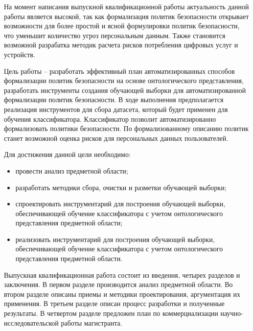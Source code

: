 \documentclass[../main]{subfiles}
\begin{document}
На момент написания выпускной квалификационной работы актуальность данной работы является высокой, так как формализация политик безопасности открывает возможности для более простой и ясной формулировки политик безопасности, что уменьшит количество угроз персональным данным. Также становится возможной разрабатка методик расчета рисков потребления цифровых услуг и устройств.

Цель работы -- разработать эффективный план автоматизированных способов формализации политик безопасности на основе онтологического представления, разработать инструменты создания обучающей выборки для автоматизированной формализации политик безопасности. В ходе выполнения предполагается реализация инструментов для сбора датасета, который будет применен для обучения классификатора. Классификатор позволит автоматизированно формализовать политики безопасности. По формализованному описанию политик станет возможной оценка рисков для персональных данных пользователей.

Для достижения данной цели необходимо:

\begin{itemize}
    \item провести анализ предметной области;
    \item разработать методики сбора, очистки и разметки обучающей выборки;
    \item спроектировать инструментарий для построения обучающей выборки, обеспечивающей обучение классификатора с учетом онтологического представления предметной области;
    \item реализовать  инструментарий для построения обучающей выборки, обеспечивающей обучение классификатора с учетом онтологического представления предметной области.
\end{itemize}

Выпускная  квалификационная  работа  состоит  из  введения, четырех разделов и заключения. В первом разделе производится анализ предметной области. Во втором разделе описаны приемы и методики проектирования, аргументация их применения. В третьем разделе описан процесс разработки и полученные результаты. В четвертом разделе предложен план по коммерциализации научно-исследовательской работы магистранта.
\end{document}
